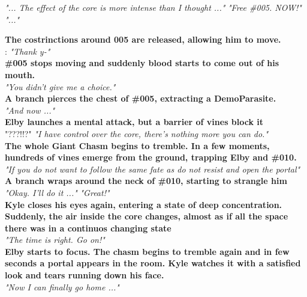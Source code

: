 \begin{dialogue}
	 \textit{"... The effect of the core is more intense than I thought ..."}
	 \textit{"Free \#005. NOW!"}
	 \textit{"..."}
	
	\textbf{The costrinctions around 005 are released, allowing him to move.}\\
	
	: \textit{"Thank y-"}\\
	
	\textbf{\#005 stops moving and suddenly blood starts to come out of his mouth.}\\
	
	 \textit{"You didn't give me a choice."}\\
	
	\textbf{A branch pierces the chest of \#005, extracting a DemoParasite.}\\
	
	 
	 
	 \textit{"And now ..."}
	 
	 \\
	
	\textbf{Elby launches a mental attack, but a barrier of vines block it}\\
	 "???!!?"
	 
	 \textit{"I have control over the core, there's nothing more you can do."}\\
	
	\textbf{The whole Giant Chasm begins to tremble. In a few moments, hundreds of vines emerge from the ground, trapping Elby and \#010.}\\
	
	 \textit{"If you do not want to follow the same fate as  do not resist and open the portal"}\\
	
	\textbf{A branch wraps around the neck of \#010, starting to strangle him}\\
	
	  \textit{"Okay. I'll do it ..."}
	 \textit{"Great!"}\\
	
	\textbf{Kyle closes his eyes again, entering a state of deep concentration. Suddenly, the air inside the core changes, almost as if all the space there was in a continuos changing state}\\
	
	 \textit{"The time is right. Go on!"}\\
	
	\textbf{Elby starts to focus. The chasm begins to tremble again and in few seconds a portal appears in the room. Kyle watches it with a satisfied look and tears running down his face.}\\
	
	 \textit{"Now I can finally go home ..."}
\end{dialogue}
